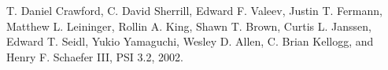 T. Daniel Crawford, C. David Sherrill, Edward F. Valeev, Justin
T. Fermann, Matthew L. Leininger, Rollin A. King, Shawn T. Brown,
Curtis L. Janssen, Edward T. Seidl, Yukio Yamaguchi, Wesley D. Allen,
C. Brian Kellogg, and Henry F. Schaefer III, PSI 3.2, 2002.
